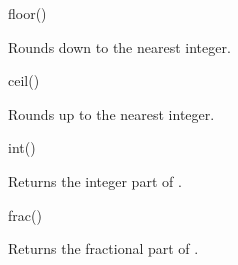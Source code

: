 \begin{math-function}{floor()}
\mathcommand

	Rounds  down to the nearest integer.
	
\begin{codeexample}[]
 \pgfmathresult
\end{codeexample}

\begin{codeexample}[]
 \pgfmathresult
\end{codeexample}

\begin{codeexample}[]
 \pgfmathresult
\end{codeexample}
\end{math-function}

\begin{math-function}{ceil()}
\mathcommand

	Rounds  up to the nearest integer.

\begin{codeexample}[]
 \pgfmathresult
\end{codeexample}

\begin{codeexample}[]
 \pgfmathresult
\end{codeexample}

\begin{codeexample}[]
 \pgfmathresult
\end{codeexample}

\end{math-function}

\begin{math-function}{int()}
\mathcommand

	Returns the integer part of .

\begin{codeexample}[]
 \pgfmathresult
\end{codeexample}

\end{math-function}

\begin{math-function}{frac()}
\mathcommand

	Returns the fractional part of .

\begin{codeexample}[]
 \pgfmathresult
\end{codeexample}

\end{math-function}

